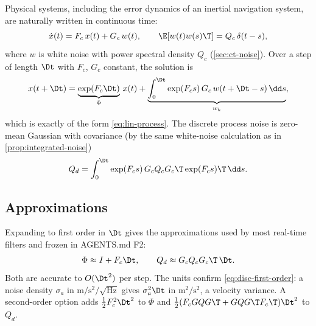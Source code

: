 Physical systems, including the error dynamics of an inertial navigation system, are naturally written in
continuous time:
\begin{equation}
  \dot x(t) = F_c\, x(t) + G_c\, w(t), \qquad \E[w(t)w(s)\T] = Q_c\,\delta(t - s),
  \label{eq:ct-model}
\end{equation}
where $w$ is white noise with power spectral density $Q_c$ (\cref{sec:ct-noise}). Over a step of length
$\Dt$ with $F_c$, $G_c$ constant, the solution is
\begin{equation}
  x(t + \Dt) = \underbrace{\exp(F_c\Dt)}_{\Phi}\, x(t) + \underbrace{\int_0^\Dt \exp(F_c s)\,G_c\,w(t + \Dt - s)\,\dd s}_{w_k},
\end{equation}
which is exactly of the form \eqref{eq:lin-process}. The discrete process noise is zero-mean Gaussian with
covariance (by the same white-noise calculation as in \cref{prop:integrated-noise})
\begin{equation}
  Q_d = \int_0^\Dt \exp(F_c s)\, G_c Q_c G_c\T \exp(F_c s)\T\,\dd s .
  \label{eq:qd-exact}
\end{equation}

\subsection{Approximations}

Expanding to first order in $\Dt$ gives the approximations used by most real-time filters and frozen in
AGENTS.md F2:
\begin{equation}
  \Phi \approx I + F_c\Dt, \qquad Q_d \approx G_c Q_c G_c\T\,\Dt .
  \label{eq:disc-first-order}
\end{equation}
Both are accurate to $O(\Dt^2)$ per step. The units confirm \eqref{eq:disc-first-order}: a noise density
$\sigma_a$ in $\mathrm{m/s^2/\sqrt{Hz}}$ gives $\sigma_a^2\Dt$ in $\mathrm{m^2/s^2}$, a velocity variance. A
second-order option adds $\tfrac12F_c^2\Dt^2$ to $\Phi$ and
$\tfrac12(F_cGQG\T + GQG\T F_c\T)\Dt^2$ to $Q_d$.

